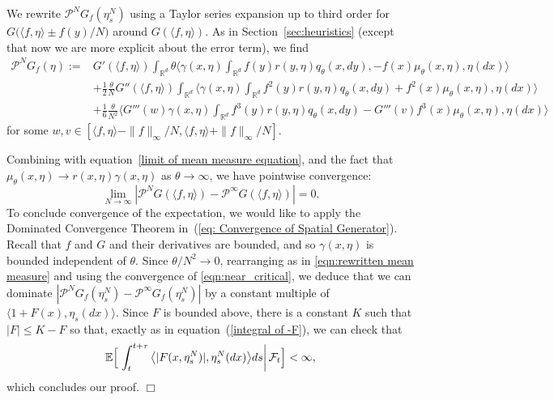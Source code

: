 \documentclass[12pt]{article}
\newenvironment {proof}{{\noindent\bf Proof }}{\hfill $\Box$ \medskip}
\newcommand{\IE}{\mathbb E}
\newcommand{\IR}{\mathbb R}
\newcommand{\Pgen}{\mathcal{P}}    %
\numberwithin{equation}{section}
\begin{document}
\begin{proof}
We rewrite $\Pgen^NG_f(\eta^N_s)$ using a 
Taylor series expansion up to third order for
$G\big(\langle f,\eta\rangle\pm f(y)/N\big)$ around
$G(\langle f, \eta \rangle )$.
As in Section~\ref{sec:heuristics} (except that now we are more explicit about
the error term), we find
\begin{equation} 
    \label{eq: Pre-Limit Generator Expanded}
\begin{aligned}
\Pgen^{N} G_f(\eta)
    :=& 
    G'(\langle f, \eta \rangle)\int_{\IR^d}  
\theta\Big\langle \gamma(x,\eta) \int_{\IR^d} f(y)r(y,\eta) q_{\theta}(x,dy), 
    - f(x)\mu_\theta(x,\eta), \eta(dx)\Big\rangle\\
&+\frac{1}{2}\frac{\theta}{N}G''(\langle f, \eta \rangle)\int_{\IR^d} 
 \Big\langle\gamma(x, \eta)\int_{\IR^d} f^2(y) r(y,\eta)q_{\theta}(x,dy)+f^2(x)
\mu_\theta(x, \eta), \eta(dx)\Big\rangle\\
&+\frac{1}{6}\frac{\theta}{N^2}\Big\langle
G'''(w) \gamma(x, \eta)\int_{\IR^d} f^3(y) r(y,\eta) 
q_{\theta}(x,dy)
-G'''(v)f^3(x)\mu_\theta(x, \eta), \eta(dx)\Big\rangle
\end{aligned}    
\end{equation}
for some $w,v \in [\langle f,\eta \rangle - \|f\|_\infty/N, 
\langle f,\eta \rangle + \|f\|_\infty/N]$.

Combining with equation~\eqref{limit of mean measure equation}, and the fact
that $\mu_\theta(x,\eta) \to r(x,\eta)\gamma(x,\eta)$ as $\theta\to\infty$, we have
pointwise convergence:
\begin{equation}
\lim_{N\to \infty} |\mathcal{P}^{N}G(\langle f, \eta \rangle) 
- \mathcal{P}^{\infty}G(\langle f, \eta \rangle)| = 0 .
\end{equation}
To conclude convergence of the expectation, 
we would like to apply the Dominated Convergence 
Theorem in~(\ref{eq: Convergence of Spatial Generator}).
Recall that $f$ and $G$ and their derivatives are bounded,
and so $\gamma(x,\eta)$ is bounded independent of $\theta$.
Since $\theta/N^2 \to 0$,
rearranging as in \eqref{eqn:rewritten mean measure}
and using the convergence of \eqref{eqn:near_critical},
we deduce that we can dominate
$\left| \Pgen^{N}G_f(\eta^{N}_s) -\Pgen^{\infty}G_f(\eta^{N}_s) \right|$
by a constant multiple of $\langle 1+F(x),\eta_s(dx)\rangle$.
Since $F$ is bounded above, there is a constant $K$ such that $|F|\leq K-F$ so
that, exactly as in equation~(\ref{integral of -F}), 
we can check that
\[
\IE\Big[\left.\int_t^{t+\tau}\big\langle |F(x,\eta^N_s)|,\eta^N_s(dx)\big\rangle ds
\right| {\cal F}_t\Big]<\infty,
\]
which concludes our proof.
\end{proof}
\end{document}

